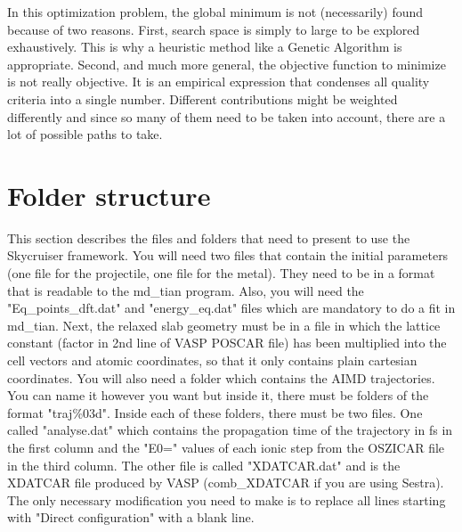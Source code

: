 \documentclass[twoside, 11pt, titlepage, captions=nooneline, a4paper, headsepline]{scrbook}%
\newcommand{\9}{\mathrm}
\newcommand{\0}{\,\mathrm}
\begin{document}
In this optimization problem, the global minimum is not (necessarily) found because of two reasons. First, search space is simply to large to be explored exhaustively. This is why a heuristic method like a Genetic Algorithm is appropriate. Second, and much more general, the objective function to minimize is not really objective. It is an empirical expression that condenses all quality criteria into a single number. Different contributions might be weighted differently and since so many of them need to be taken into account, there are a lot of possible paths to take.

\section{Folder structure}
This section describes the files and folders that need to present to use the Skycruiser framework. You will need two files that contain the initial parameters (one file for the projectile, one file for the metal). They need to be in a format that is readable to the md\_tian program. Also, you will need the "Eq\_points\_dft.dat" and "energy\_eq.dat" files which are mandatory to do a fit in md\_tian. Next, the relaxed slab geometry must be in a file in which the lattice constant (factor in 2nd line of VASP POSCAR file) has been multiplied into the cell vectors and atomic coordinates, so that it only contains plain cartesian coordinates. You will also need a folder which contains the AIMD trajectories. You can name it however you want but inside it, there must be folders of the format "traj\%03d". Inside each of these folders, there must be two files. One called "analyse.dat" which contains the propagation time of the trajectory in fs in the first column and the "E0=" values of each ionic step from the OSZICAR file in the third column. The other file is called "XDATCAR.dat" and is the XDATCAR file produced by VASP (comb\_XDATCAR if you are using Sestra). The only necessary modification you need to make is to replace all lines starting with "Direct configuration" with a blank line.
\end{document}
